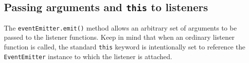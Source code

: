 \begin{Shaded}
\begin{Highlighting}[]
  \OperatorTok{=} \NormalTok{(}\NormalTok{)}\OperatorTok{;}

 \NormalTok{ \{\}}

\OperatorTok{=}  \NormalTok{()}\OperatorTok{;}
\NormalTok{(}\OperatorTok{,}\NormalTok{ () }\KeywordTok{=\textgreater{}}\NormalTok{ \{}
  \NormalTok{(}\NormalTok{)}\OperatorTok{;}
\NormalTok{\})}\OperatorTok{;}
\NormalTok{(}\NormalTok{)}\OperatorTok{;}
\end{Highlighting}
\end{Shaded}

\subsection{\texorpdfstring{Passing arguments and \texttt{this} to
listeners}{Passing arguments and this to listeners}}\label{passing-arguments-and-this-to-listeners}

The \texttt{eventEmitter.emit()} method allows an arbitrary set of
arguments to be passed to the listener functions. Keep in mind that when
an ordinary listener function is called, the standard \texttt{this}
keyword is intentionally set to reference the \texttt{EventEmitter}
instance to which the listener is attached.

